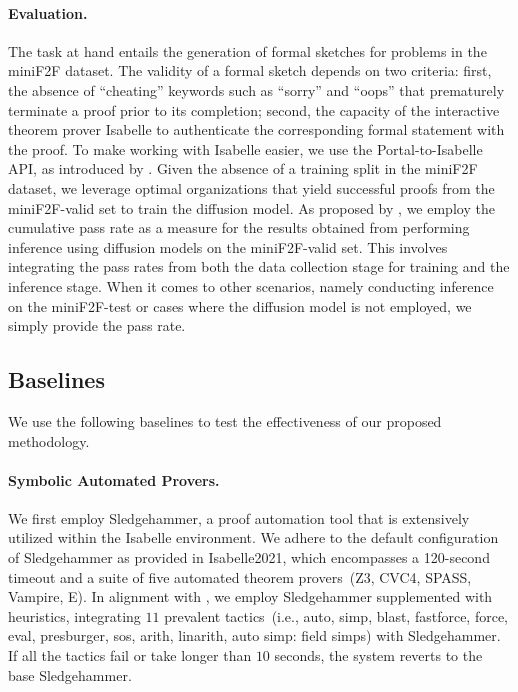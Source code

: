 \documentclass{article}
\begin{document}
\paragraph{Evaluation.}
The task at hand entails the generation of formal sketches for problems in the miniF2F dataset. The validity of a formal sketch depends on two criteria: first, the absence of ``cheating'' keywords such as ``sorry'' and ``oops'' that prematurely terminate a proof prior to its completion; second, the capacity of the interactive theorem prover Isabelle to authenticate the corresponding formal statement with the proof. To make working with Isabelle easier, we use the Portal-to-Isabelle API, as introduced by \citet{jiang2022draft}. 
Given the absence of a training split in the miniF2F dataset, we leverage optimal organizations that yield successful proofs from the miniF2F-valid set to train the diffusion model. As proposed by \citet{lample2022hypertree}, we employ the cumulative pass rate as a measure for the results obtained from performing inference using diffusion models on the miniF2F-valid set. This involves integrating the pass rates from both the data collection stage for training and the inference stage.  When it comes to other scenarios, namely conducting inference on the miniF2F-test or cases where the diffusion model is not employed, we simply provide the pass rate.

\subsection{Baselines}
We use the following baselines to test the effectiveness of our proposed methodology.

\paragraph{Symbolic Automated Provers.}
We first employ Sledgehammer, a proof automation tool that is extensively utilized within the Isabelle environment. We adhere to the default configuration of Sledgehammer as provided in Isabelle2021, which encompasses a 120-second timeout and a suite of five automated theorem provers~(Z3, CVC4, SPASS, Vampire, E). In alignment with \citet{jiang2022draft}, we employ Sledgehammer supplemented with heuristics, integrating $11$ prevalent tactics~(i.e., auto, simp, blast, fastforce, force, eval, presburger, sos, arith, linarith, auto simp: field simps) with Sledgehammer.  If all the tactics fail or take longer than $10$ seconds, the system reverts to the base Sledgehammer.
\end{document}
